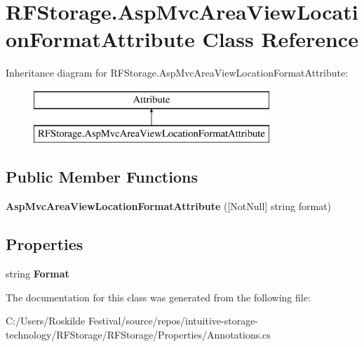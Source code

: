 \section{R\+F\+Storage.\+Asp\+Mvc\+Area\+View\+Location\+Format\+Attribute Class Reference}
\label{class_r_f_storage_1_1_asp_mvc_area_view_location_format_attribute}
Inheritance diagram for R\+F\+Storage.\+Asp\+Mvc\+Area\+View\+Location\+Format\+Attribute\+:\begin{figure}[H]
\begin{center}
\leavevmode
\includegraphics[height=2.000000cm]{class_r_f_storage_1_1_asp_mvc_area_view_location_format_attribute}
\end{center}
\end{figure}
\subsection*{Public Member Functions}
\begin{DoxyCompactItemize}
\item 
\mbox{\label{class_r_f_storage_1_1_asp_mvc_area_view_location_format_attribute_a41ea3037429c25a152f1486081552202}} 
{\bfseries Asp\+Mvc\+Area\+View\+Location\+Format\+Attribute} ([Not\+Null] string format)
\end{DoxyCompactItemize}
\subsection*{Properties}
\begin{DoxyCompactItemize}
\item 
\mbox{\label{class_r_f_storage_1_1_asp_mvc_area_view_location_format_attribute_a14939f37da9e71cf6d333976fb5594bf}} 
string {\bfseries Format}\hspace{0.3cm}{\ttfamily  [get]}
\end{DoxyCompactItemize}


The documentation for this class was generated from the following file\+:\begin{DoxyCompactItemize}
\item 
C\+:/\+Users/\+Roskilde Festival/source/repos/intuitive-\/storage-\/technology/\+R\+F\+Storage/\+R\+F\+Storage/\+Properties/Annotations.\+cs\end{DoxyCompactItemize}
